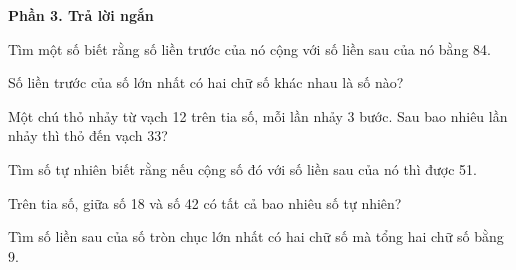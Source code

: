 \textbf{Phần 3. Trả lời ngắn}

\begin{ex} %
Tìm một số biết rằng số liền trước của nó cộng với số liền sau của nó bằng 84.
\end{ex}

\begin{ex} %
Số liền trước của số lớn nhất có hai chữ số khác nhau là số nào?
\end{ex}

\begin{ex} %
Một chú thỏ nhảy từ vạch 12 trên tia số, mỗi lần nhảy 3 bước. Sau bao nhiêu lần nhảy thì thỏ đến vạch 33?
\end{ex}

\begin{ex} %
Tìm số tự nhiên biết rằng nếu cộng số đó với số liền sau của nó thì được 51.
\end{ex}

\begin{ex} %
Trên tia số, giữa số 18 và số 42 có tất cả bao nhiêu số tự nhiên?
\end{ex}

\begin{ex} %
Tìm số liền sau của số tròn chục lớn nhất có hai chữ số mà tổng hai chữ số bằng 9.
\end{ex}
